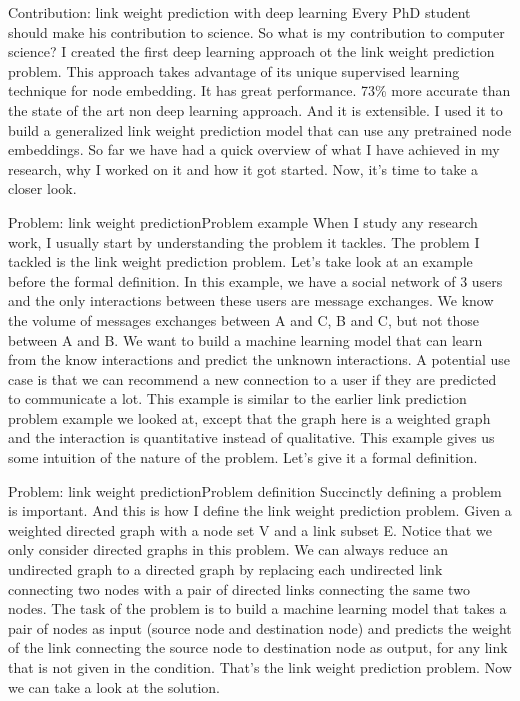 \documentclass{beamer}
\begin{document}
\begin{frame}{Contribution: link weight prediction with deep learning}
Every PhD student should make his contribution to science. So what is my contribution to computer science? I created the first deep learning approach ot the link weight prediction problem. This approach takes advantage of its unique supervised learning technique for node embedding. It has great performance. 73\% more accurate than the state of the art non deep learning approach. And it is extensible. I used it to build a generalized link weight prediction model that can use any pretrained node embeddings. So far we have had a quick overview of what I have achieved in my research, why I worked on it and how it got started. Now, it's time to take a closer look.
\end{frame}

\begin{frame}{Problem: link weight prediction}{Problem example}
When I study any research work, I usually start by understanding the problem it tackles. The problem I tackled is the link weight prediction problem. Let's take look at an example before the formal definition. In this example, we have a social network of 3 users and the only interactions between these users are message exchanges. We know the volume of messages exchanges between A and C, B and C, but not those between A and B. We want to build a machine learning model that can learn from the know interactions and predict the unknown interactions. A potential use case is that we can recommend a new connection to a user if they are predicted to communicate a lot. This example is similar to the earlier link prediction problem example we looked at, except that the graph here is a weighted graph and the interaction is quantitative instead of qualitative. This example gives us some intuition of the nature of the problem. Let's give it a formal definition.
\end{frame}

\begin{frame}{Problem: link weight prediction}{Problem definition}
Succinctly defining a problem is important. And this is how I define the link weight prediction problem. Given a weighted directed graph with a node set V and a link subset E. Notice that we only consider directed graphs in this problem. We can always reduce an undirected graph to a directed graph by replacing each undirected link connecting two nodes with a pair of directed links connecting the same two nodes. The task of the problem is to build a machine learning model that takes a pair of nodes as input (source node and destination node) and predicts the weight of the link connecting the source node to destination node as output, for any link that is not given in the condition. That's the link weight prediction problem. Now we can take a look at the solution.
\end{frame}
\end{document}
